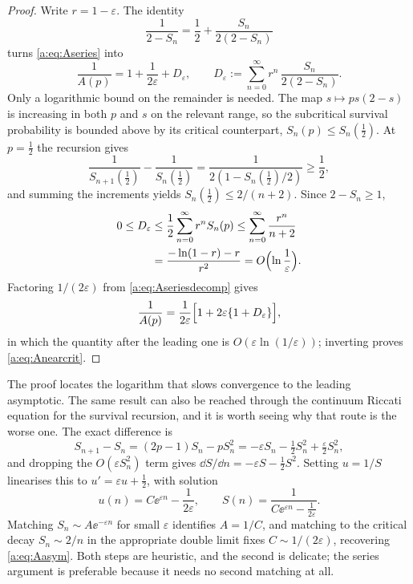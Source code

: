 \begin{proof}
Write $r=1-\varepsilon$. The identity
\begin{equation*}
\frac{1}{2-S_n} = \frac12 + \frac{S_n}{2(2-S_n)}
\end{equation*}
turns \cref{a:eq:Aseries} into
\begin{equation}
\label{a:eq:Aseriesdecomp}
\frac1{A(p)} = 1 + \frac{1}{2\varepsilon} + D_\varepsilon,
\qquad
D_\varepsilon := \sum_{n=0}^{\infty}r^n\,\frac{S_n}{2(2-S_n)} .
\end{equation}
Only a logarithmic bound on the remainder is needed. The map
$s\mapsto ps(2-s)$ is increasing in both $p$ and $s$ on the relevant range, so
the subcritical survival probability is bounded above by its critical
counterpart, $S_n(p)\le S_n(\tfrac12)$. At $p=\tfrac12$ the recursion gives
\begin{equation*}
\frac{1}{S_{n+1}(\tfrac12)}-\frac{1}{S_n(\tfrac12)}
= \frac{1}{2(1-S_n(\tfrac12)/2)} \ge \frac12 ,
\end{equation*}
and summing the increments yields $S_n(\tfrac12)\le2/(n+2)$. Since $2-S_n\ge1$,
\begin{align}
0\le D_\varepsilon
&\le \frac12\sum_{n=0}^{\infty}r^nS_n(p)
\le \sum_{n=0}^{\infty}\frac{r^n}{n+2} \notag\\
&= \frac{-\ln(1-r)-r}{r^2}
= O\Bigl(\ln\frac1\varepsilon\Bigr) .
\label{a:eq:Depsbound}
\end{align}
Factoring $1/(2\varepsilon)$ from \cref{a:eq:Aseriesdecomp} gives
\begin{equation*}
\frac1{A(p)} = \frac{1}{2\varepsilon}\Bigl[1+2\varepsilon\{1+D_\varepsilon\}\Bigr],
\end{equation*}
in which the quantity after the leading one is
$O(\varepsilon\ln(1/\varepsilon))$; inverting proves \cref{a:eq:Anearcrit}.
\end{proof}

The proof locates the logarithm that slows convergence to the leading asymptotic.
The same result can also be reached through the continuum Riccati equation for the
survival recursion, and it is worth seeing why that route is the worse one. The
exact difference is
\begin{equation*}
S_{n+1}-S_n = (2p-1)S_n - pS_n^2
= -\varepsilon S_n - \tfrac12S_n^2 + \tfrac{\varepsilon}{2}S_n^2 ,
\end{equation*}
and dropping the $O(\varepsilon S_n^2)$ term gives
$\dd S/\dd n = -\varepsilon S-\tfrac12S^2$. Setting $u=1/S$ linearises this to
$u' = \varepsilon u+\tfrac12$, with solution
\begin{equation*}
u(n) = C\ee^{\varepsilon n} - \frac{1}{2\varepsilon},
\qquad
S(n) = \frac{1}{C\ee^{\varepsilon n}-\frac{1}{2\varepsilon}} .
\end{equation*}
Matching $S_n\sim A\ee^{-\varepsilon n}$ for small $\varepsilon$ identifies
$A=1/C$, and matching to the critical decay $S_n\sim2/n$ in the appropriate double
limit fixes $C\sim1/(2\varepsilon)$, recovering \cref{a:eq:Aasym}. Both steps are
heuristic, and the second is delicate; the series argument is preferable because it
needs no second matching at all.

